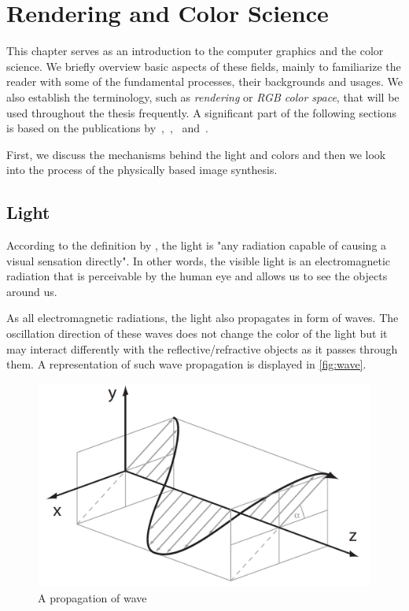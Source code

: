 \chapter{Rendering and Color Science}
\label{chap:render}

This chapter serves as an introduction to the computer graphics and the color science. We briefly overview basic aspects of these fields, mainly to familiarize the reader with some of the fundamental processes, their backgrounds and usages. We also establish the terminology, such as \emph{rendering} or \emph{RGB color space}, that will be used throughout the thesis frequently. A significant part of the following sections is based on the publications by~\citet{wyszecki1982color},~\citet{colorScienceSlides},~\citet{nimier2019mitsuba} and~\citet{pharr2016physically}.

First, we discuss the mechanisms behind the light and colors and then we look into the process of the physically based image synthesis.

\section{Light}

According to the definition by \citet{barbrow1964international}, the light is "any radiation capable of causing a visual sensation directly". In other words, the visible light is an electromagnetic radiation that is perceivable by the human eye and allows us to see the objects around us. 

As all electromagnetic radiations, the light also propagates in form of waves. The oscillation direction of these waves does not change the color of the light but it may interact differently with the reflective/refractive objects as it passes through them. A representation of such wave propagation is displayed in \autoref{fig:wave}.

\begin{figure}[h]
	\centering
	\includegraphics[width=0.7\linewidth]{img/wave.png}
	\caption{A propagation of wave~\cite{colorScienceSlides}}
	\label{fig:wave}
\end{figure}


